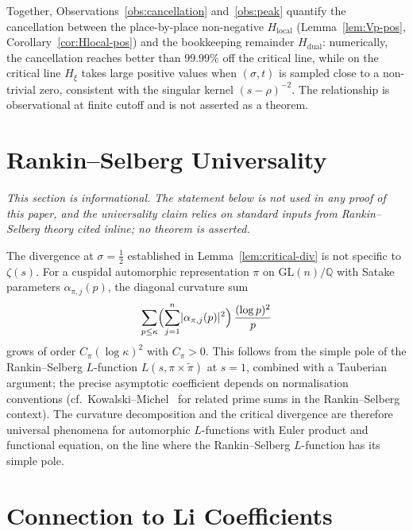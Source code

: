 \documentclass[11pt]{article}
\newcommand{\Hxi}{H_{\xi}}
\newcommand{\Hlocal}{H_{\mathrm{local}}}
\newcommand{\Hdual}{H_{\mathrm{dual}}}
\begin{document}
Together, Observations~\ref{obs:cancellation}
and~\ref{obs:peak} quantify the cancellation between the
place-by-place non-negative $\Hlocal$
(Lemma~\ref{lem:Vp-pos}, Corollary~\ref{cor:Hlocal-pos})
and the bookkeeping remainder $\Hdual$: numerically, the
cancellation reaches better than $99.99\%$ off the critical
line, while on the critical line $\Hxi$ takes large positive
values when $(\sigma,t)$ is sampled close to a non-trivial
zero, consistent with the singular kernel $(s-\rho)^{-2}$.
The relationship is observational at finite cutoff and is
not asserted as a theorem.

\section{Rankin--Selberg Universality}
\label{sec:rs}

\emph{This section is informational.
The statement below is not used in any proof of this paper,
and the universality claim relies on standard inputs from
Rankin--Selberg theory cited inline; no theorem is asserted.}

The divergence at $\sigma=\tfrac12$ established in
Lemma~\ref{lem:critical-div} is not specific to $\zeta(s)$.
For a cuspidal automorphic representation $\pi$ on
$\mathrm{GL}(n)/\mathbb{Q}$ with Satake parameters
$\alpha_{\pi,j}(p)$, the diagonal curvature sum
\[
\sum_{p\le\kappa}\Bigl(\sum_{j=1}^{n}
\lvert\alpha_{\pi,j}(p)\rvert^{2}\Bigr)\,
\frac{(\log p)^{2}}{p}
\]
grows of order $C_{\pi}(\log\kappa)^{2}$ with $C_{\pi}>0$.
This follows from the simple pole of the Rankin--Selberg
$L$-function $L(s,\pi\times\widetilde{\pi})$ at $s=1$,
combined with a Tauberian argument; the precise asymptotic
coefficient depends on normalisation conventions
(cf.\ Kowalski--Michel~\cite{KowalskiMichel} for related
prime sums in the Rankin--Selberg context).
The curvature decomposition and the critical divergence are
therefore universal phenomena for automorphic $L$-functions
with Euler product and functional equation, on the line
where the Rankin--Selberg $L$-function has its simple pole.

\section{Connection to Li Coefficients}
\label{sec:li-comparison}
\end{document}
